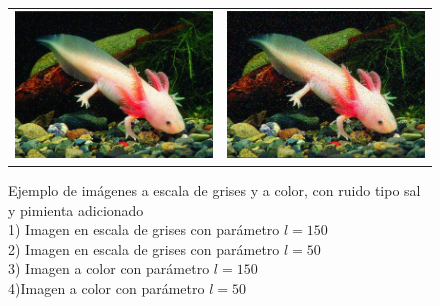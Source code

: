 \begin{landscape}
\begin{figure}[!h]
\begin{tabular}{cc}
				\includegraphics[width=11cm]{Imagenes/Ruido_sp_color_1.png} & \includegraphics[width=11cm]{Imagenes/Ruido_sp_color_2.png}
			\end{tabular}
			\label{Ruido_sal_pimienta}
			\caption{Ejemplo de imágenes a escala de grises y a color, con ruido tipo sal y pimienta adicionado \\ 1) Imagen en escala de grises con parámetro $l = 150$ \\ 2) Imagen en escala de grises con parámetro $l = 50$ \\ 3) Imagen a color con parámetro $l = 150$ \\ 4)Imagen a color con parámetro $l = 50$}
		\end{figure}
	\end{landscape}
	
